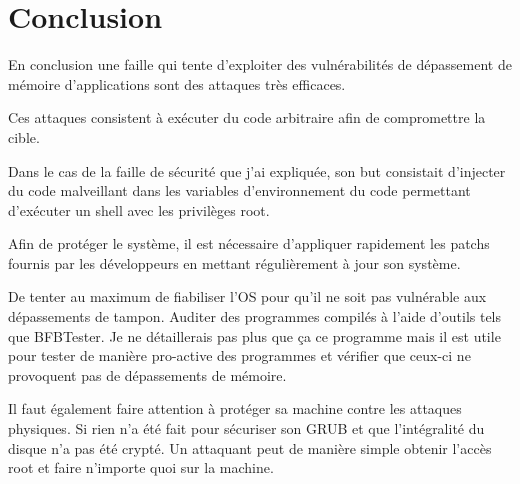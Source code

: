 \documentclass[12pt,a4paper]{article}
\begin{document}
        \section{Conclusion}
        \begin{flushleft}
            \item En conclusion une faille qui tente d'exploiter des vulnérabilités de dépassement de mémoire d'applications sont des attaques très efficaces.
            \item Ces attaques consistent à exécuter du code arbitraire afin de compromettre la cible. 
            \item Dans le cas de la faille de sécurité que j'ai expliquée, son but consistait d'injecter du code malveillant dans les variables d'environnement du code permettant d'exécuter un shell avec les privilèges root.
            \item Afin de protéger le système, il est nécessaire d'appliquer rapidement les patchs fournis par les développeurs en mettant régulièrement à jour son système. 
            \item De tenter au maximum de fiabiliser l'OS pour qu'il ne soit pas vulnérable aux dépassements de tampon. Auditer des programmes compilés à l'aide d'outils tels que BFBTester. Je ne détaillerais pas plus que ça ce programme mais il est utile pour tester de manière pro-active des programmes et vérifier que ceux-ci ne provoquent pas de dépassements de mémoire.
            \item Il faut également faire attention à protéger sa machine contre les attaques physiques. Si rien n'a été fait pour sécuriser son GRUB et que l'intégralité du disque n'a pas été crypté. Un attaquant peut de manière simple obtenir l'accès root et faire n'importe quoi sur la machine.

        \end{flushleft}
        \newpage
        \nocite{*}
	
	
\end{document}
